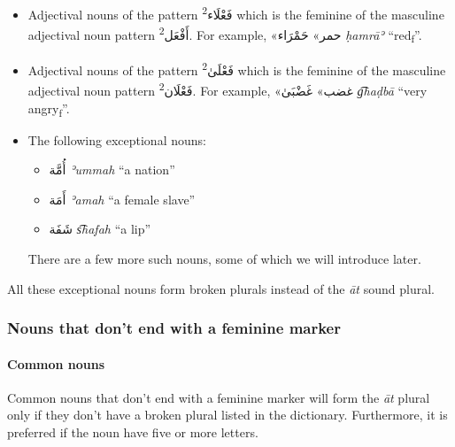\documentclass[
  10pt,
]{book}
\providecommand{\tightlist}{%
  \setlength{\itemsep}{0pt}\setlength{\parskip}{0pt}}
\begin{document}
\begin{itemize}
\item
  Adjectival nouns of the pattern \textsuperscript{2}\foreignlanguage{arabic}{فَعْلَاء} which is the feminine of the masculine adjectival noun pattern \textsuperscript{2}\foreignlanguage{arabic}{أَفْعَل}. For example, \foreignlanguage{arabic}{«حمر»} \foreignlanguage{arabic}{حَمْرَاء} \emph{ḥamrāʾ} \enquote{red\textsubscript{f}}.
\item
  Adjectival nouns of the pattern \textsuperscript{2}\foreignlanguage{arabic}{فَعْلَىٰ} which is the feminine of the masculine adjectival noun pattern \textsuperscript{2}\foreignlanguage{arabic}{فَعْلَان}. For example, \foreignlanguage{arabic}{«غضب»} \foreignlanguage{arabic}{غَضْبَىٰ} \emph{g͡haḍbā} \enquote{very angry\textsubscript{f}}.
\item
  The following exceptional nouns:

  \begin{itemize}
  \tightlist
  \item
    \foreignlanguage{arabic}{أُمَّة} \emph{ʾummah} \enquote{a nation}
  \item
    \foreignlanguage{arabic}{أَمَة} \emph{ʾamah} \enquote{a female slave}
  \item
    \foreignlanguage{arabic}{شَفَة} \emph{s͡hafah} \enquote{a lip}
  \end{itemize}

  There are a few more such nouns, some of which we will introduce later.
\end{itemize}

All these exceptional nouns form broken plurals instead of the \emph{āt} sound plural.

\subsubsection{Nouns that don't end with a feminine marker}\label{nouns-that-dont-end-with-a-feminine-marker}

\paragraph*{Common nouns}\label{common-nouns-1}

Common nouns that don't end with a feminine marker will form the \emph{āt} plural only if they don't have a broken plural listed in the dictionary. Furthermore, it is preferred if the noun have five or more letters.
\end{document}
